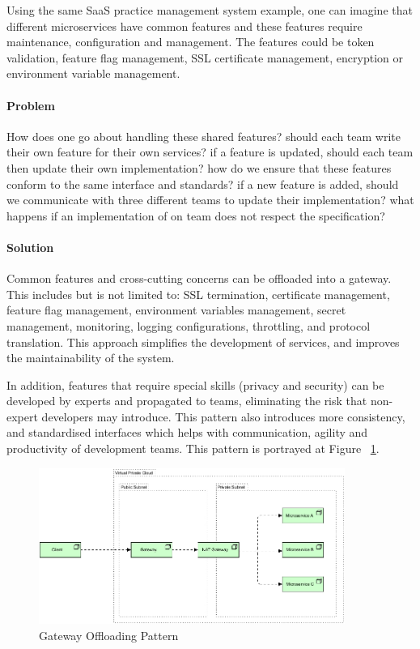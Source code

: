 \documentclass{bmcart}
\begin{document}
Using the same SaaS practice management system example, one can imagine that different microservices have common features and these features require maintenance, configuration and management. The features could be token validation, feature flag management, SSL certificate management, encryption or environment variable management. 


\paragraph{Problem}

How does one go about handling these shared features? should each team write their own feature for their own services? if a feature is updated, should each team then update their own implementation? how do we ensure that these features conform to the same interface and standards? if a new feature is added, should we communicate with three different teams to update their implementation? what happens if an implementation of on team does not respect the specification?

\paragraph{Solution}

Common features and cross-cutting concerns can be offloaded into a gateway. This includes but is not limited to: SSL termination, certificate management, feature flag management, environment variables management, secret management, monitoring, logging configurations, throttling, and protocol translation. This approach simplifies the development of services, and improves the maintainability of the system. 

In addition, features that require special skills (privacy and security) can be developed by experts and propagated to teams, eliminating the risk that non-expert developers may introduce. This pattern also introduces more consistency, and standardised interfaces which helps with communication, agility and productivity of development teams. This pattern is portrayed at Figure ~\ref{gatewayOffloading}.

\begin{figure}[h]
  \includegraphics[width=10cm]{Media/Gateway Offloading.jpg}
  \caption{Gateway Offloading Pattern}
  \label{gatewayOffloading}
\end{figure}
\end{document}
